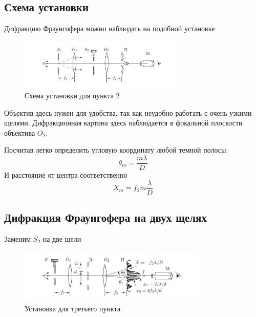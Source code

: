 \documentclass[a4paper, 12pt]{article}%
\begin{document}
\newpage

\subsection*{Схема установки}
Дифракцию Фраунгофера можно наблюдать на подобной установке 

\begin{figure}[h]
\begin{center}
\includegraphics[width = 0.7\textwidth]{pics/4.png}
\caption{Схема установки для пункта 2}
\end{center}
\end{figure}

Объектив здесь нужен для удобства, так как неудобно работать с очень узкими щелями. Дифракционная картина здесь наблюдается в фокальной плоскости объектива $O_2$. 

Посчитав легко определить угловую координату любой темной полосы:
\begin{equation}
\theta_m = \frac{m \lambda}{D}
\end{equation}
И расстояние от центра соответственно 
\begin{equation}
X_m = f_2m\frac{\lambda}{D}
\end{equation}

\subsection*{Дифракция Фраунгофера на двух щелях}

Заменим $S_2$ на две щели 

\begin{figure}[h]
\begin{center}
\includegraphics[width = 0.8\textwidth]{pics/5.png}
\caption{Установка для третьего пункта}
\end{center}
\end{figure}
\end{document}
